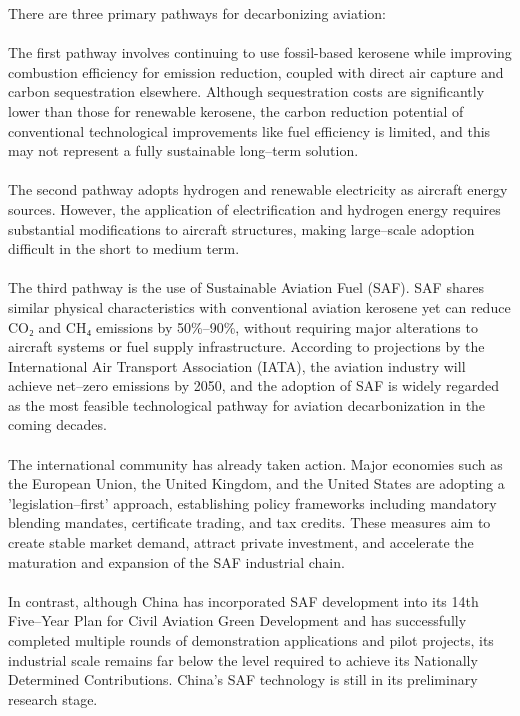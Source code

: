 \documentclass[a4paper,11pt]{article}
\begin{document}
There are three primary pathways for decarbonizing aviation:\\
\\
The first pathway involves continuing to use fossil-based kerosene while improving combustion efficiency for emission reduction, coupled with direct air capture and carbon sequestration elsewhere. Although sequestration costs are significantly lower than those for renewable kerosene, the carbon reduction potential of conventional technological improvements like fuel efficiency is limited, and this may not represent a fully sustainable long--term solution.\\
\\
The second pathway adopts hydrogen and renewable electricity as aircraft energy sources. However, the application of electrification and hydrogen energy requires substantial modifications to aircraft structures, making large--scale adoption difficult in the short to medium term.\\
\\
The third pathway is the use of Sustainable Aviation Fuel (SAF). SAF shares similar physical characteristics with conventional aviation kerosene yet can reduce CO₂ and CH₄ emissions by 50\%--90\%, without requiring major alterations to aircraft systems or fuel supply infrastructure. According to projections by the International Air Transport Association (IATA), the aviation industry will achieve net--zero emissions by 2050, and the adoption of SAF is widely regarded as the most feasible technological pathway for aviation decarbonization in the coming decades.\\
\\
The international community has already taken action. Major economies such as the European Union, the United Kingdom, and the United States are adopting a 'legislation--first' approach, establishing policy frameworks including mandatory blending mandates, certificate trading, and tax credits. These measures aim to create stable market demand, attract private investment, and accelerate the maturation and expansion of the SAF industrial chain.\\
\\
In contrast, although China has incorporated SAF development into its 14th Five--Year Plan for Civil Aviation Green Development \cite{caac2021} and has successfully completed multiple rounds of demonstration applications and pilot projects, its industrial scale remains far below the level required to achieve its Nationally Determined Contributions. China's SAF technology is still in its preliminary research stage.\\
\end{document}
